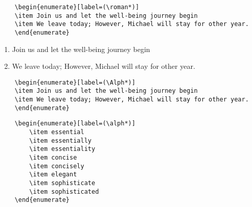 \documentclass{article}
\begin{document}
\begin{verbatim}
    \begin{enumerate}[label=(\roman*)]
    \item Join us and let the well-being journey begin 
    \item We leave today; However, Michael will stay for other year. 
    \end{enumerate}
\end{verbatim}

\begin{enumerate}[label=(\Alph*)]
\item Join us and let the well-being journey begin 
\item We leave today; However, Michael will stay for other year. 
\end{enumerate}

\begin{verbatim}
    \begin{enumerate}[label=(\Alph*)]
    \item Join us and let the well-being journey begin 
    \item We leave today; However, Michael will stay for other year. 
    \end{enumerate}
\end{verbatim}

\begin{verbatim}
    \begin{enumerate}[label=(\alph*)]
        \item essential 
        \item essentially 
        \item essentiality 
        \item concise 
        \item concisely 
        \item elegant 
        \item sophisticate 
        \item sophisticated
    \end{enumerate}
\end{verbatim}
\end{document}
